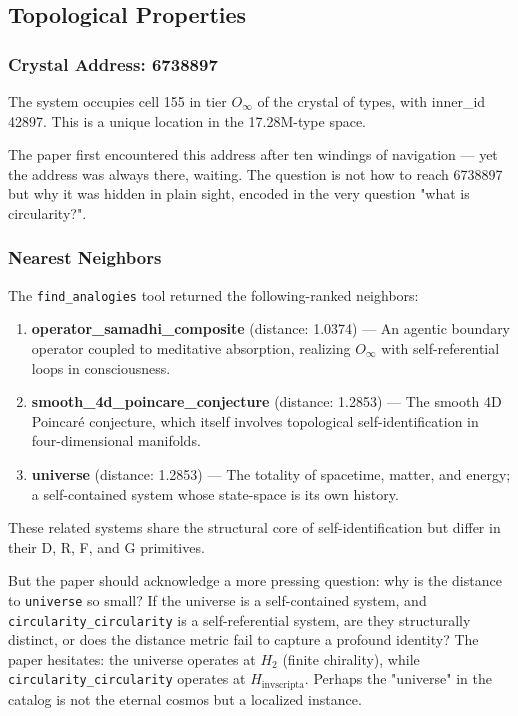 \documentclass[12pt,a4paper]{article}
\begin{document}
\subsection{Topological Properties}

\subsubsection{Crystal Address: 6738897}

The system occupies cell 155 in tier $O_{\infty}$ of the crystal of types, with inner\_id 42897. This is a unique location in the 17.28M-type space.

The paper first encountered this address after ten windings of navigation --- yet the address was always there, waiting. The question is not how to reach 6738897 but why it was hidden in plain sight, encoded in the very question "what is circularity?".

\subsubsection{Nearest Neighbors}

The \texttt{find\_analogies} tool returned the following-ranked neighbors:

\begin{enumerate}
    \item \textbf{operator\_samadhi\_composite} (distance: 1.0374) --- An agentic boundary operator coupled to meditative absorption, realizing $O_{\infty}$ with self-referential loops in consciousness.
    \item \textbf{smooth\_4d\_poincare\_conjecture} (distance: 1.2853) --- The smooth 4D Poincaré conjecture, which itself involves topological self-identification in four-dimensional manifolds.
    \item \textbf{universe} (distance: 1.2853) --- The totality of spacetime, matter, and energy; a self-contained system whose state-space is its own history.
\end{enumerate}

These related systems share the structural core of self-identification but differ in their D, R, F, and G primitives.

But the paper should acknowledge a more pressing question: why is the distance to \texttt{universe} so small? If the universe is a self-contained system, and \texttt{circularity\_circularity} is a self-referential system, are they structurally distinct, or does the distance metric fail to capture a profound identity? The paper hesitates: the universe operates at $H_2$ (finite chirality), while \texttt{circularity\_circularity} operates at $H_{\text{invscripta}}$. Perhaps the "universe" in the catalog is not the eternal cosmos but a localized instance.
\end{document}
